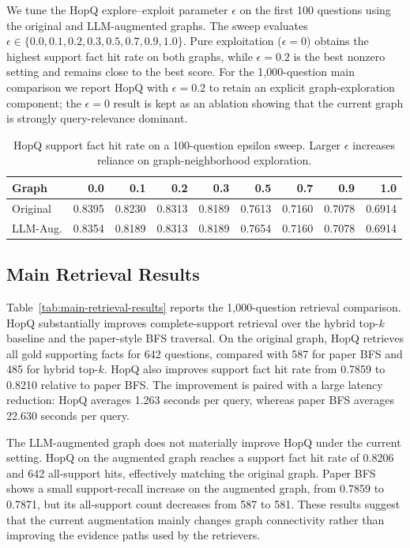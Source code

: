 We tune the HopQ explore--exploit parameter $\epsilon$ on the first 100
questions using the original and LLM-augmented graphs. The sweep evaluates
$\epsilon \in \{0.0,0.1,0.2,0.3,0.5,0.7,0.9,1.0\}$. Pure exploitation
($\epsilon=0$) obtains the highest support fact hit rate on both graphs, while
$\epsilon=0.2$ is the best nonzero setting and remains close to the best score.
For the 1{,}000-question main comparison we report HopQ with $\epsilon=0.2$ to
retain an explicit graph-exploration component; the $\epsilon=0$ result is kept
as an ablation showing that the current graph is strongly query-relevance
dominant.

\begin{table}[t]
\centering
\small
\begin{tabular}{lrrrrrrrr}
\hline
Graph & 0.0 & 0.1 & 0.2 & 0.3 & 0.5 & 0.7 & 0.9 & 1.0 \\
\hline
Original & 0.8395 & 0.8230 & 0.8313 & 0.8189 & 0.7613 & 0.7160 & 0.7078 & 0.6914 \\
LLM-Aug. & 0.8354 & 0.8189 & 0.8313 & 0.8189 & 0.7654 & 0.7160 & 0.7078 & 0.6914 \\
\hline
\end{tabular}
\caption{HopQ support fact hit rate on a 100-question epsilon sweep. Larger $\epsilon$ increases reliance on graph-neighborhood exploration.}
\label{tab:epsilon-sweep}
\end{table}

\subsection{Main Retrieval Results}
\label{sec:main-results}

Table~\ref{tab:main-retrieval-results} reports the 1{,}000-question retrieval
comparison. HopQ substantially improves complete-support retrieval over the
hybrid top-$k$ baseline and the paper-style BFS traversal. On the original
graph, HopQ retrieves all gold supporting facts for 642 questions, compared
with 587 for paper BFS and 485 for hybrid top-$k$. HopQ also improves support
fact hit rate from 0.7859 to 0.8210 relative to paper BFS. The improvement is
paired with a large latency reduction: HopQ averages 1.263 seconds per query,
whereas paper BFS averages 22.630 seconds per query.

The LLM-augmented graph does not materially improve HopQ under the current
setting. HopQ on the augmented graph reaches a support fact hit rate of 0.8206
and 642 all-support hits, effectively matching the original graph. Paper BFS
shows a small support-recall increase on the augmented graph, from 0.7859 to
0.7871, but its all-support count decreases from 587 to 581. These results
suggest that the current augmentation mainly changes graph connectivity rather
than improving the evidence paths used by the retrievers.

